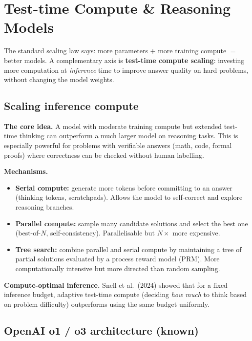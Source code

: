 
\section{Test-time Compute \& Reasoning Models}

The standard scaling law says: more parameters $+$ more training compute $=$ better models.
A complementary axis is \textbf{test-time compute scaling}: investing more computation
at \emph{inference} time to improve answer quality on hard problems, without changing
the model weights.

\subsection{Scaling inference compute}

\textbf{The core idea.} A model with moderate training compute but extended test-time
thinking can outperform a much larger model on reasoning tasks. This is especially
powerful for problems with verifiable answers (math, code, formal proofs) where
correctness can be checked without human labelling.

\textbf{Mechanisms.}
\begin{itemize}
  \item \textbf{Serial compute:} generate more tokens before committing to an answer
    (thinking tokens, scratchpads). Allows the model to self-correct and explore
    reasoning branches.
  \item \textbf{Parallel compute:} sample many candidate solutions and select the
    best one (best-of-$N$, self-consistency). Parallelisable but $N\times$ more
    expensive.
  \item \textbf{Tree search:} combine parallel and serial compute by maintaining a
    tree of partial solutions evaluated by a process reward model (PRM). More
    computationally intensive but more directed than random sampling.
\end{itemize}

\textbf{Compute-optimal inference.} Snell et al.\ (2024) showed that for a fixed
inference budget, adaptive test-time compute (deciding \emph{how much} to think based
on problem difficulty) outperforms using the same budget uniformly.

\subsection{OpenAI o1 / o3 architecture (known)}

